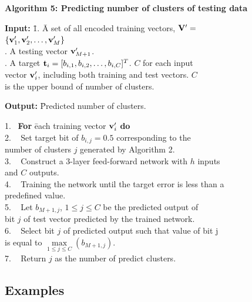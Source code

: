 \documentclass[lettersize,journal]{IEEEtran}
\begin{document}
\vspace{0.2in}
\noindent
{\bf Algorithm 5: Predicting number of clusters of testing data}
\begin{tabbing}
{\bf Input:}  \= 1. \= A set of all encoded training vectors, ${\bf V}^{\prime} = $ \\
              \>    \> $\{{\bf v}^{\prime}_{1}, {\bf v}^{\prime}_{2}, \ldots, {\bf v}^{\prime}_{M}\}$ \\
              . \> A testing vector ${\bf v}^{\prime}_{M+1}$. \\
              . \> A target ${\bf t}_{i} = [b_{i,1}, b_{i,2}, \ldots, b_{i,C}]^{T}$. $C$ for each 
                       input \\
              \>    \> vector ${\bf v}^{\prime}_{i}$, including both training and test vectors. $C$ \\
              \>    \> is the upper bound of number of clusters.
\end{tabbing}
\begin{tabbing}
{\bf Output:} \= Predicted number of clusters.
\end{tabbing}
\begin{tabbing}
1. ~\= {\bf For} \= each training vector ${\bf v}^{\prime}_{i}$ {\bf do} \\
2. ~\>           \> Set target bit of $b_{i,j} = 0.5$ corresponding to the \\
    \>           \> number of clusters $j$ generated by Algorithm 2. \\
3. ~\> Construct a 3-layer feed-forward network with $h$ inputs \\
    \> and $C$ outputs. \\
4. ~\> Training the network until the target error is less than a \\
    \> predefined value. \\
5. ~\> Let $b_{M+1,j}$, $1 \leq j \leq C$ be the predicted output of \\
    \> bit $j$ of test vector predicted by the trained network.\\
6. ~\> Select bit $j$ of predicted output such that value of bit j \\
    \> is equal to $\max\limits_{1 \leq j \leq C} (b_{M+1,j})$. \\
7. ~\> Return $j$ as the number of predict clusters.
\end{tabbing}

\subsection{Examples}
\end{document}
